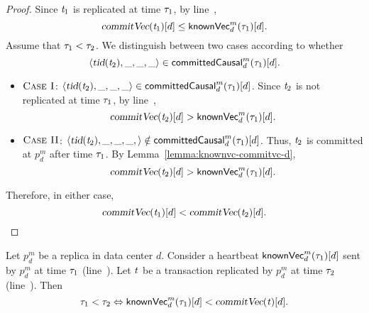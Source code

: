 \begin{proof} \label{proof:replication-order}
  Since $\mathit{t}_{1}$ is replicated at time $\tau_{1}$,
  by line~\code{\ref{alg:unistore-replication}}{\ref{line:propagate-txs}},
  \[
    \textsl{commitVec}(\mathit{t}_{1})[d] \le {\sf knownVec}^{m}_{d}(\tau_{1})[d].
  \]
  Assume that $\tau_{1} < \tau_{2}$.
  We distinguish between two cases according to whether
  \[
    \langle \textsl{tid}(\mathit{t}_{2}), \_, \_, \_ \rangle \in {\sf committedCausal}^{m}_{d}(\tau_{1})[d].
  \]
  \begin{itemize}
    \item $\textsc{Case I}$:
      $\langle \textsl{tid}(\mathit{t}_{2}), \_, \_, \_ \rangle \in {\sf committedCausal}^{m}_{d}(\tau_{1})[d]$.
      Since $\mathit{t}_{2}$ is not replicated at time $\tau_{1}$,
      by line~\code{\ref{alg:unistore-replication}}{\ref{line:propagate-txs}},
      \[
        \textsl{commitVec}(\mathit{t}_{2})[d] > {\sf knownVec}^{m}_{d}(\tau_{1})[d].
      \]
    \item $\textsc{Case II}$:
      $\langle \textsl{tid}(\mathit{t}_{2}), \_, \_, \_, \rangle \notin {\sf committedCausal}^{m}_{d}(\tau_{1})[d]$.
      Thus, $\mathit{t}_{2}$ is committed at $p^{m}_{d}$ after time $\tau_{1}$.
      By Lemma~\ref{lemma:knownvc-commitvc-d},
      \[
        \textsl{commitVec}(\mathit{t}_{2})[d] > {\sf knownVec}^{m}_{d}(\tau_{1})[d].
      \]
  \end{itemize}
  Therefore, in either case,
  \[
    \textsl{commitVec}(\mathit{t}_{1})[d] < \textsl{commitVec}(\mathit{t}_{2})[d].
  \]
\end{proof}

\begin{applemma} \label{lemma:heartbeat-replication-order}
  Let $p^{m}_{d}$ be a replica in data center $d$.
  Consider a heartbeat ${\sf knownVec}^{m}_{d}(\tau_{1})[d]$
  sent by $p^{m}_{d}$ at time $\tau_{1}$
  (line~\code{\ref{alg:unistore-replication}}{\ref{line:propagate-call-heartbeat}}).
  Let $\mathit{t}$ be a transaction replicated by $p^{m}_{d}$ at time $\tau_{2}$
  (line~\code{\ref{alg:unistore-replication}}{\ref{line:propagate-call-replicate}}).
  Then
  \[
    \tau_{1} < \tau_{2} \Leftrightarrow {\sf knownVec}^{m}_{d}(\tau_{1})[d] < \textsl{commitVec}(\mathit{t})[d].
  \]
\end{applemma}

